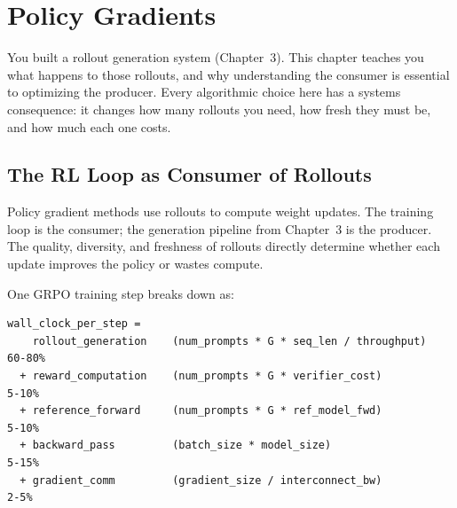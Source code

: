 \section*{Policy Gradients}

\smallskip

\begin{whythis}
You built a rollout generation system (Chapter~3). This chapter teaches you what happens to those rollouts, and why understanding the consumer is essential to optimizing the producer. Every algorithmic choice here has a systems consequence: it changes how many rollouts you need, how fresh they must be, and how much each one costs.
\end{whythis}

\subsection*{The RL Loop as Consumer of Rollouts}

Policy gradient methods use rollouts to compute weight updates. The training loop is the consumer; the generation pipeline from Chapter~3 is the producer. The quality, diversity, and freshness of rollouts directly determine whether each update improves the policy or wastes compute.

One GRPO training step breaks down as:

\begin{lstlisting}
wall_clock_per_step =
    rollout_generation    (num_prompts * G * seq_len / throughput)    60-80%
  + reward_computation    (num_prompts * G * verifier_cost)           5-10%
  + reference_forward     (num_prompts * G * ref_model_fwd)           5-10%
  + backward_pass         (batch_size * model_size)                    5-15%
  + gradient_comm         (gradient_size / interconnect_bw)            2-5%
\end{lstlisting}

